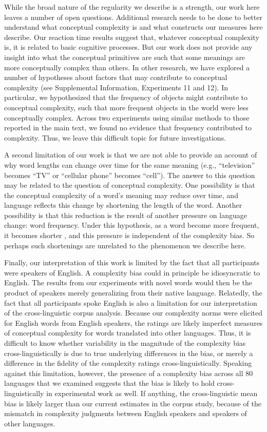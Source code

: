 \documentclass[man]{apa2}
\begin{document}
While the broad nature of the regularity we describe is a strength, our work here leaves a number of open questions. Additional research needs to be done to better understand what conceptual complexity is and what constructs our measures here describe. Our reaction time results suggest that, whatever conceptual complexity is, it is related to basic cognitive processes. But our work does not provide any insight into what the conceptual primitives are such that some meanings are more conceptually complex than others. In other research, we have explored a number of hypotheses about factors that may contribute to conceptual complexity (see Supplemental Information, Experiments 11 and 12). In particular, we hypothesized that the frequency of objects might contribute to conceptual complexity, such that more frequent objects in the world were less conceptually complex. Across two experiments using similar methods to those reported in the main text, we found no evidence that frequency contributed to complexity. Thus, we leave this difficult topic for future investigations.

A second limitation of our work is that we are not able to provide an account of why word lengths can change over time for the same meaning (e.g., ``television'' becomes ``TV'' or ``cellular phone'' becomes ``cell''). The answer to this question may be related to the question of conceptual complexity. One possibility is that the conceptual complexity of a word's meaning may reduce over time, and language reflects this change by shortening the length of the word. Another possibility is that this reduction is the result of another pressure on language change: word frequency. Under this hypothesis, as a word become more frequent, it becomes shorter \cite{zipf1936}, and this pressure is independent of the complexity bias. So perhaps such shortenings are unrelated to the phenomenon we describe here.

Finally, our interpretation of this work is limited by the fact that all participants were speakers of English. A complexity bias could in principle be idiosyncratic to English. The results from our experiments with novel words would then be the product of speakers merely generalizing from their native language. Relatedly, the fact that all participants spoke English is also a limitation for our interpretation of the cross-linguistic corpus analysis. Because our complexity norms were elicited for English words from English speakers, the ratings are likely imperfect measures of conceptual complexity for words translated into other languages. Thus, it is difficult to know whether variability in the magnitude of the complexity bias cross-linguistically is due to true underlying differences in the bias, or merely a difference in the fidelity of the complexity ratings cross-linguistically. Speaking against this limitation, however, the presence of a complexity bias across all 80 languages that we examined suggests that the bias is likely to hold cross-linguistically in experimental work as well. If anything, the cross-linguistic mean bias is likely larger than our current estimates in the corpus study, because of the mismatch in complexity judgments between English speakers and speakers of other languages.
\end{document}
